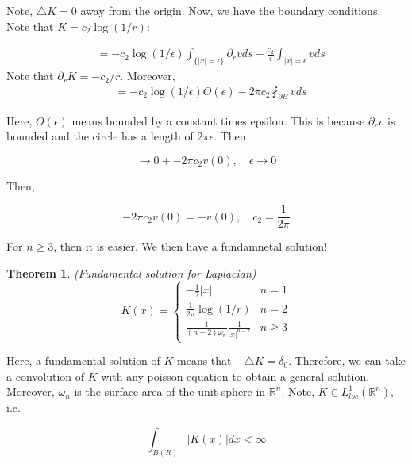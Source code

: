 \documentclass{article}
\newtheorem{theorem}{Theorem}[section]
\newtheorem{one minute paper}[theorem]{One Minute Paper}
\begin{document}
Note, $\triangle K =0$ away from the origin. Now, we have the boundary conditions. Note that $K = c_2 \log(1/r)$: 

\begin{align*}
    &= -c_2 \log(1/\epsilon)\int_{\{|x| = \epsilon\}}\partial_r v ds - \frac{c_2}{\epsilon}\int_{|x|=\epsilon}vds 
\end{align*}
Note that $\partial_r K = -c_2/r$. Moreover, 
\begin{align*}
    &= -c_2\log(1/\epsilon)O(\epsilon) - 2\pi c_2 \fint_{\partial B}vds
\end{align*}

Here, $O(\epsilon)$ means bounded by a constant times epsilon. This is because $\partial_r v$ is bounded and the circle has a length of $2\pi \epsilon$. Then 

\begin{equation}
    \rightarrow 0 + -2\pi c_2 v(0), \quad \epsilon \rightarrow 0
\end{equation}

Then, 

\begin{equation}
    -2\pi c_2 v(0)= -v(0), \quad c_2 = \frac{1}{2\pi}
\end{equation}

For $n \geq 3$, then it is easier. We then have a fundamnetal solution! 

\begin{theorem}
    (Fundamental solution for Laplacian)
    \begin{equation}
        K(x) = \begin{cases}
            -\frac{1}{2}|x| & n = 1\\
            \frac{1}{2\pi}\log(1/r) & n=2 \\
            \frac{1}{(n-2)\omega_n}\frac{1}{|x|^{n-2}} & n \geq 3 
        \end{cases}
    \end{equation}
\end{theorem}

Here, a fundamental solution of $K$ means that $-\triangle K = \delta_0$. Therefore, we can take a convolution of $K$ with any poisson equation to obtain a general solution.
Moreover, $\omega_n$ is the surface area of the unit sphere in $\mathbb{R}^n$. Note, $K \in L^1_{loc}(\mathbb{R}^n)$, i.e. 

\begin{equation}
    \int_{B(R)} |K(x)| dx < \infty
\end{equation}
\end{document}

